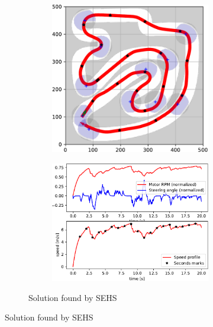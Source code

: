 \begin{figure}[!tbp]
	\vspace{0.75cm}
	
	\begin{subfigure}[t]{\textwidth}	
		\begin{subfigure}[t]{0.45\textwidth}
			\includegraphics[width=\textwidth]{../img/experiments/zurich-sehs-trajectory}
		\end{subfigure}
		\hfill
		\begin{subfigure}[t]{0.45\textwidth}
			\includegraphics[width=\textwidth]{../img/experiments/zurich-sehs-actuators}
		\end{subfigure}
		\caption{Solution found by SEHS}
		\label{fig:zurich-sehs}
	\end{subfigure}


\end{figure}
